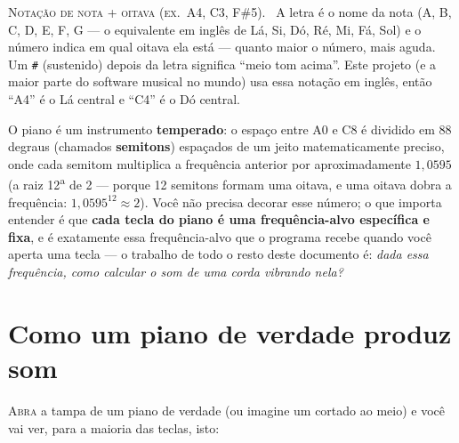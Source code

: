 \documentclass[11pt,oneside]{book}
\newcommand{\nova}[1]{\textsc{\color{accent}#1.}~}
\newcommand{\opening}[2]{\lettrine[lines=2,loversize=0.08,lraise=0.02]{#1}{#2}}
\begin{document}
\begin{newword}
\nova{Notação de nota + oitava (ex.\ A4, C3, F\#5)} A letra é o nome da nota
(A, B, C, D, E, F, G --- o equivalente em inglês de Lá, Si, Dó, Ré, Mi, Fá,
Sol) e o número indica em qual oitava ela está --- quanto maior o número,
mais aguda. Um \texttt{\#} (sustenido) depois da letra significa \enquote{meio
tom acima}. Este projeto (e a maior parte do software musical no mundo) usa
essa notação em inglês, então \enquote{A4} é o Lá central e \enquote{C4} é o
Dó central.
\end{newword}

O piano é um instrumento \textbf{temperado}: o espaço entre A0 e C8 é
dividido em 88 degraus (chamados \textbf{semitons}) espaçados de um jeito
matematicamente preciso, onde cada semitom multiplica a frequência anterior
por aproximadamente $1{,}0595$ (a raiz 12\textsuperscript{a} de 2 --- porque
12 semitons formam uma oitava, e uma oitava dobra a frequência:
$1{,}0595^{12} \approx 2$). Você não precisa decorar esse número; o que
importa entender é que \textbf{cada tecla do piano é uma frequência-alvo
específica e fixa}, e é exatamente essa frequência-alvo que o programa
recebe quando você aperta uma tecla --- o trabalho de todo o resto deste
documento é: \emph{dada essa frequência, como calcular o som de uma corda
vibrando nela?}

\chapter{Como um piano de verdade produz som}

\opening{A}{bra} a tampa de um piano de verdade (ou imagine um cortado ao
meio) e você vai ver, para a maioria das teclas, isto:
\end{document}
